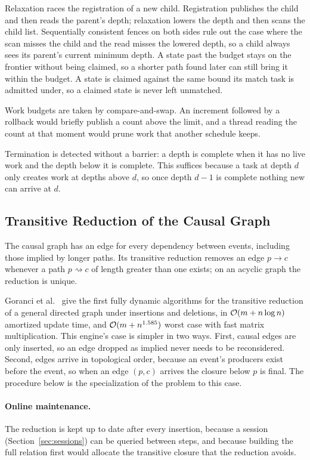 Relaxation races the registration of a new child. Registration publishes the child and then reads
the parent's depth; relaxation lowers the depth and then scans the child list. Sequentially
consistent fences on both sides rule out the case where the scan misses the child and the read
misses the lowered depth, so a child always sees its parent's current minimum depth. A state past
the budget stays on the frontier without being claimed, so a shorter path found later can still
bring it within the budget. A state is claimed against the same bound its match task is admitted
under, so a claimed state is never left unmatched.

Work budgets are taken by compare-and-swap. An increment followed by a rollback would briefly
publish a count above the limit, and a thread reading the count at that moment would prune work
that another schedule keeps.

Termination is detected without a barrier: a depth is complete when it has no live work and the
depth below it is complete. This suffices because a task at depth $d$ only creates work at depths
above $d$, so once depth $d-1$ is complete nothing new can arrive at $d$.

\subsection{Transitive Reduction of the Causal Graph}
\label{sec:tr}

The causal graph has an edge for every dependency between events, including those implied by
longer paths. Its transitive reduction removes an edge $p \to c$ whenever a path
$p \rightsquigarrow c$ of length greater than one exists; on an acyclic graph the reduction is
unique.

Goranci et al.~\cite{goranci2025dynamic} give the first fully dynamic algorithms for the transitive
reduction of a general directed graph under insertions and deletions, in $\mathcal{O}(m + n\log n)$
amortized update time, and $\mathcal{O}(m + n^{1.585})$ worst case with fast matrix multiplication. This
engine's case is simpler in two ways. First, causal edges are only inserted, so an edge dropped as implied
never needs to be reconsidered. Second, edges arrive in topological order, because an event's producers
exist before the event, so when an edge $(p,c)$ arrives the closure below $p$ is final. The
procedure below is the specialization of the problem to this case.

\paragraph{Online maintenance.}
The reduction is kept up to date after every insertion, because a session
(Section~\ref{sec:sessions}) can be queried between steps, and because building the full relation
first would allocate the transitive closure that the reduction avoids.

